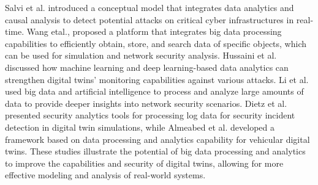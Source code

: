 Salvi et al.\cite{salviCyberresilienceCriticalCyber2022} introduced a conceptual model that integrates data analytics and causal analysis to detect potential attacks on critical cyber infrastructures in real-time. Wang etal.\cite{wangDTCPNDigitalTwin2022}, proposed a platform that integrates big data processing capabilities to efficiently obtain, store, and search data of specific objects, which can be used for simulation and network security analysis. Hussaini et al.\cite{hussainiTaxonomySecurityDefense2022}  discussed how machine learning and deep learning-based data analytics can strengthen digital twins' monitoring capabilities against various attacks. Li et al.\cite{jiaqiliSpaceSpiderHyper2022} used big data and artificial intelligence to process and analyze large amounts of data to provide deeper insights into network security scenarios. Dietz et al. \cite{dietzIntegratingDigitalTwin2020} presented security analytics tools for processing log data for security incident detection in digital twin simulations, while Almeabed et al.\cite{almeaibedDigitalTwinAnalysis2021}  developed a framework based on data processing and analytics capability for vehicular digital twins. These studies illustrate the potential of big data processing and analytics to improve the capabilities and security of digital twins, allowing for more effective modeling and analysis of real-world systems.
